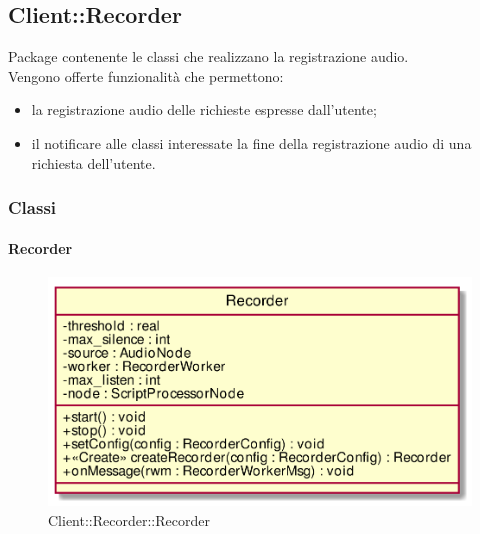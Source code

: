 \subsection{Client::Recorder}
Package contenente le classi che realizzano la registrazione audio.\\
Vengono offerte funzionalità che permettono:
\begin{itemize}
\item la registrazione audio delle richieste espresse dall'utente;
\item il notificare alle classi interessate la fine della registrazione audio di una richiesta dell'utente.

\end{itemize}

\subsubsection{Classi}
\hypertarget{Recorder_label}{\paragraph{Recorder}}
\begin{figure}[h]
	\centering
	\includegraphics[width=\textwidth,height=\textheight,keepaspectratio]{images/ClassRecorder.png}
	\caption{Client::Recorder::Recorder}
\end{figure}
